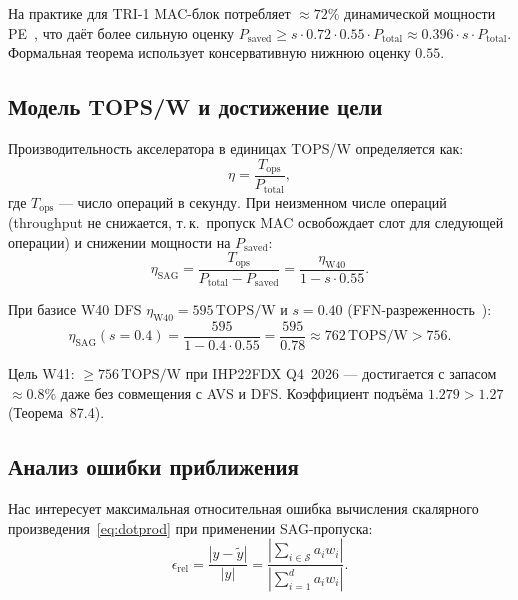 \begin{remark}
На практике для TRI-1 MAC-блок потребляет $\approx 72\%$
динамической мощности PE~\cite{ibm_northpole_2023}, что даёт
более сильную оценку $P_{\mathrm{saved}} \geq s \cdot 0{.}72
\cdot 0{.}55 \cdot P_{\mathrm{total}} \approx 0{.}396 \cdot s
\cdot P_{\mathrm{total}}$.  Формальная теорема использует
консервативную нижнюю оценку $0{.}55$.
\end{remark}

\subsection{Модель TOPS/W и достижение цели}
\label{ssec:glava87-tops-w}

Производительность акселератора в единицах TOPS/W определяется как:
\begin{equation}
  \eta = \frac{T_{\mathrm{ops}}}{P_{\mathrm{total}}},
  \label{eq:tops-w}
\end{equation}
где $T_{\mathrm{ops}}$ — число операций в секунду.  При неизменном
числе операций (throughput не снижается, т.\,к.\ пропуск MAC освобождает
слот для следующей операции) и снижении мощности на $P_{\mathrm{saved}}$:
\begin{equation}
  \eta_{\mathrm{SAG}} = \frac{T_{\mathrm{ops}}}{P_{\mathrm{total}}
  - P_{\mathrm{saved}}} = \frac{\eta_{\mathrm{W40}}}{1 - s \cdot 0{.}55}.
  \label{eq:tops-w-sag}
\end{equation}

При базисе W40 DFS $\eta_{\mathrm{W40}} = 595\,\text{TOPS/W}$
и $s = 0{.}40$ (FFN-разреженность~\cite{koren2024sparsity}):
\begin{equation}
  \eta_{\mathrm{SAG}}(s=0{.}4) = \frac{595}{1 - 0{.}4 \cdot 0{.}55}
  = \frac{595}{0{.}78} \approx 762\,\text{TOPS/W} > 756.
  \label{eq:tops-w-calc}
\end{equation}

Цель W41: $\geq 756\,\text{TOPS/W}$ при IHP22FDX Q4~2026
— достигается с запасом $\approx 0{.}8\%$ даже без совмещения с
AVS и DFS.  Коэффициент подъёма $1{.}279 > 1{.}27$ (Теорема~87.4).

\subsection{Анализ ошибки приближения}
\label{ssec:glava87-error}

Нас интересует максимальная относительная ошибка вычисления
скалярного произведения~\eqref{eq:dotprod} при применении
SAG-пропуска:
\begin{equation}
  \epsilon_{\mathrm{rel}} = \frac{|y - \tilde{y}|}{|y|}
  = \frac{|\sum_{i \in \mathcal{S}} a_i w_i|}{|\sum_{i=1}^d a_i w_i|}.
  \label{eq:rel-error}
\end{equation}

